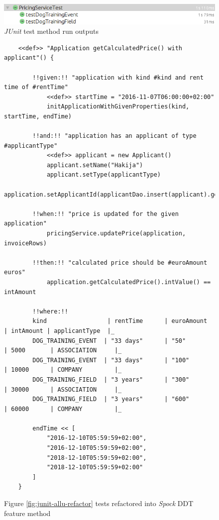     \begin{figure}[H]
      \begin{center}
        \begin{topbot}[style=mdstyle]
        \includegraphics[width=\textwidth]{images/junit-pricing-results.png}
        \end{topbot}
        \caption{\textit{JUnit} test method run outputs}
        \label{fig:junit-allu-refactor-output}
      \end{center}
    \end{figure}

    \begin{figure}[H]
        \begin{lstlisting}[style=java]
    %%@Unroll%%("getCalculatedPrice() with kind of #kind, rental time of #rentTime and applicant is #applicantType should amount to #euroAmount euros")
    <<def>> "Application getCalculatedPrice() with applicant"() {

        !!given:!! "application with kind #kind and rent time of #rentTime"
            <<def>> startTime = "2016-11-07T06:00:00+02:00"
            initApplicationWithGivenProperties(kind, startTime, endTime)

        !!and:!! "application has an applicant of type #applicantType"
            <<def>> applicant = new Applicant()
            applicant.setName("Hakija")
            applicant.setType(applicantType)
            application.setApplicantId(applicantDao.insert(applicant).getId())

        !!when:!! "price is updated for the given application"
            pricingService.updatePrice(application, invoiceRows)

        !!then:!! "calculated price should be #euroAmount euros"
            application.getCalculatedPrice().intValue() == intAmount

        !!where:!!
        kind                 | rentTime      | euroAmount    | intAmount | applicantType  |_
        DOG_TRAINING_EVENT  | "33 days"      | "50"          | 5000       | ASSOCIATION     |_
        DOG_TRAINING_EVENT  | "33 days"      | "100"         | 10000      | COMPANY         |_
        DOG_TRAINING_FIELD  | "3 years"      | "300"         | 30000      | ASSOCIATION     |_
        DOG_TRAINING_FIELD  | "3 years"      | "600"         | 60000      | COMPANY         |_

        endTime << [
            "2016-12-10T05:59:59+02:00",
            "2016-12-10T05:59:59+02:00",
            "2018-12-10T05:59:59+02:00",
            "2018-12-10T05:59:59+02:00"
        ]
    }
        \end{lstlisting}
        \caption{Figure \ref{fig:junit-allu-refactor} tests refactored into \textit{Spock} DDT feature method}
        \label{fig:spock-allu-refactor}

    \end{figure}
